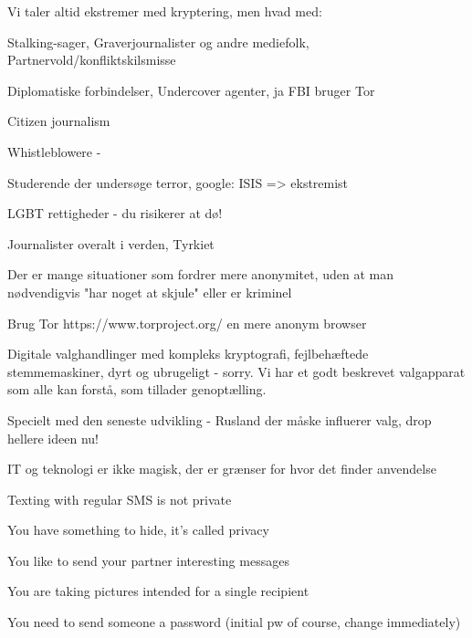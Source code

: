 \documentclass[20pt,landscape,a4paper,footrule]{foils}
\begin{document}
Vi taler altid ekstremer med kryptering, men hvad med:
\begin{list2}
\item Stalking-sager, Graverjournalister og andre mediefolk, Partnervold/konfliktskilsmisse
\item Diplomatiske forbindelser, Undercover agenter, ja FBI bruger Tor
\item Citizen journalism 
\item Whistleblowere - 
\item Studerende der undersøge terror, google: ISIS => ekstremist
\item LGBT rettigheder - du risikerer at dø!
\item Journalister overalt i verden, Tyrkiet
\end{list2}

Der er mange situationer som fordrer mere anonymitet, uden at man nødvendigvis "har noget at skjule" eller er kriminel

Brug Tor https://www.torproject.org/ en mere anonym browser


Digitale valghandlinger med kompleks kryptografi, fejlbehæftede stemmemaskiner, dyrt og ubrugeligt - sorry. Vi har et godt beskrevet valgapparat som alle kan forstå, som tillader genoptælling.

Specielt med den seneste udvikling - Rusland der måske influerer
valg, drop hellere ideen nu!

IT og teknologi er ikke magisk, der er grænser for hvor det finder anvendelse




\begin{list2}
\item Texting with regular SMS is not private
\item You have something to hide, it's called privacy
\item You like to send your partner interesting messages
\item You are taking pictures intended for a single recipient
\item You need to send someone a password (initial pw of course, change immediately)
\end{list2}

\end{document}
